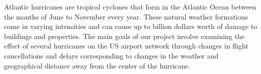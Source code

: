 
Atlantic hurricanes are tropical cyclones that form in the Atlantic Ocean between the months of June to November every year. These natural weather formations come in varying intensities and can cause up to billion dollars worth of damage to buildings and properties. The main goals of our project involve examining the effect of several hurricanes on the US airport network through changes in flight cancellations and delays corresponding to changes in the weather and geographical distance away from the center of the hurricane. 